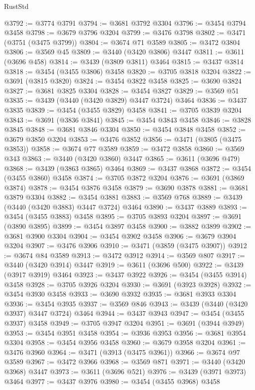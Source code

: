 \begin{lexlean}{RustStd}
\begin{coremodule}
{{{{{{{{{{{{{{{{{{{@3792 := @3774 @3791
@3794 := @3681 @3792 @3304
@3796 := @3454 @3794 @3458
@3798 := @3679 @3796 @3204
@3799 := @3476 @3798
@3802 := @3471 (@3751 (@3475 @3799))
@3804 := @3674 @71 @3589
@3805 := @3472 @3804
@3806 := @3569 @45
@3809 := @3440 (@3420 @3806) @3447
@3811 := @3611 (@3696 @458)
@3814 := @3439 (@3809 @3811) @3464
@3815 := @3437 @3814
@3818 := @3454 (@3455 @3806) @3458
@3820 := @3705 @3818 @3204
@3822 := @3691 (@3815 @3820)
@3824 := @3454 @3822 @3458
@3825 := @3690 @3824
@3827 := @3681 @3825 @3304
@3828 := @3454 @3827
@3829 := @3569 @51
@3835 := @3439 (@3440 (@3420 @3829) @3447 @3724) @3464
@3836 := @3437 @3835
@3839 := @3454 (@3455 @3829) @3458
@3841 := @3705 @3839 @3204
@3843 := @3691 (@3836 @3841)
@3845 := @3454 @3843 @3458
@3846 := @3828 @3845
@3848 := @3681 @3846 @3304
@3850 := @3454 @3848 @3458
@3852 := @3679 @3850 @3204
@3853 := @3476 @3852
@3856 := @3471 (@3805 (@3475 @3853))
@3858 := @3674 @77 @3589
@3859 := @3472 @3858
@3860 := @3569 @343
@3863 := @3440 (@3420 @3860) @3447
@3865 := @3611 (@3696 @479)
@3868 := @3439 (@3863 @3865) @3464
@3869 := @3437 @3868
@3872 := @3454 (@3455 @3860) @3458
@3874 := @3705 @3872 @3204
@3876 := @3691 (@3869 @3874)
@3878 := @3454 @3876 @3458
@3879 := @3690 @3878
@3881 := @3681 @3879 @3304
@3882 := @3454 @3881
@3883 := @3569 @768
@3889 := @3439 (@3440 (@3420 @3883) @3447 @3724) @3464
@3890 := @3437 @3889
@3893 := @3454 (@3455 @3883) @3458
@3895 := @3705 @3893 @3204
@3897 := @3691 (@3890 @3895)
@3899 := @3454 @3897 @3458
@3900 := @3882 @3899
@3902 := @3681 @3900 @3304
@3904 := @3454 @3902 @3458
@3906 := @3679 @3904 @3204
@3907 := @3476 @3906
@3910 := @3471 (@3859 (@3475 @3907))
@3912 := @3674 @84 @3589
@3913 := @3472 @3912
@3914 := @3569 @807
@3917 := @3440 (@3420 @3914) @3447
@3919 := @3611 (@3696 @500)
@3922 := @3439 (@3917 @3919) @3464
@3923 := @3437 @3922
@3926 := @3454 (@3455 @3914) @3458
@3928 := @3705 @3926 @3204
@3930 := @3691 (@3923 @3928)
@3932 := @3454 @3930 @3458
@3933 := @3690 @3932
@3935 := @3681 @3933 @3304
@3936 := @3454 @3935
@3937 := @3569 @846
@3943 := @3439 (@3440 (@3420 @3937) @3447 @3724) @3464
@3944 := @3437 @3943
@3947 := @3454 (@3455 @3937) @3458
@3949 := @3705 @3947 @3204
@3951 := @3691 (@3944 @3949)
@3953 := @3454 @3951 @3458
@3954 := @3936 @3953
@3956 := @3681 @3954 @3304
@3958 := @3454 @3956 @3458
@3960 := @3679 @3958 @3204
@3961 := @3476 @3960
@3964 := @3471 (@3913 (@3475 @3961))
@3966 := @3674 @97 @3589
@3967 := @3472 @3966
@3968 := @3569 @871
@3971 := @3440 (@3420 @3968) @3447
@3973 := @3611 (@3696 @521)
@3976 := @3439 (@3971 @3973) @3464
@3977 := @3437 @3976
@3980 := @3454 (@3455 @3968) @3458
}}}}}}}}}}}}}}}}}}}
\end{coremodule}
\end{lexlean}
